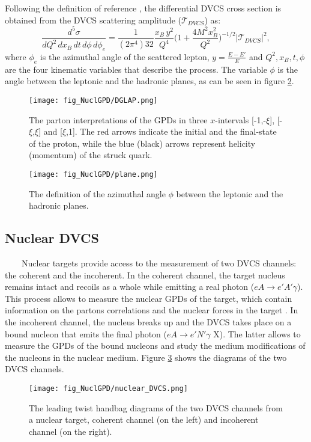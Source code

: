Following the definition of reference \cite{Ji:1998pc}, the differential DVCS 
cross section is obtained from the DVCS scattering amplitude 
($\mathcal{T}_{DVCS}$) as:
\begin{equation}
 \frac{d^{5}\sigma}{dQ^{2}\, dx_{B}\, dt\, d\phi\, d\phi_{e}} = 
 \frac{1}{(2\pi^{4})32}\frac{x_{B}\, 
 y^{2}}{Q^{4}}\bigg(1+\frac{4M^{2}x_{B}^{2}}{Q^{2}}\bigg)^{-1/2} 
 |\mathcal{T}_{DVCS}|^{2},
\label{DVCSCrossSection_tot}
\end{equation}
where $\phi_{e}$ is the azimuthal angle of the scattered lepton, 
$y=\frac{E-E'}{E}$ and $Q^{2},x_{B}, t, \phi$ are the four kinematic variables 
that describe the process. The variable $\phi$ is the angle between the 
leptonic and the hadronic planes, as can be seen in figure \ref{fig:phi}.\\

\begin{figure}[tb]
\centering
\texttt{[image: fig\_NuclGPD/DGLAP.png]}
\caption{The parton interpretations of the GPDs in three $x$-intervals 
[-1,-$\xi$], [-$\xi$,$\xi$] and [$\xi$,1]. The red arrows indicate the initial 
and the final-state of the proton, while the blue (black) arrows represent 
helicity (momentum) of the struck quark.} \label{DGLAP}
\end{figure}

\begin{figure}[tb]
\centering
\texttt{[image: fig\_NuclGPD/plane.png]}
\caption{The definition of the azimuthal angle $\phi$ between the leptonic and 
the hadronic planes.} \label{fig:phi}
\end{figure}



\subsection{Nuclear DVCS}
~~~~Nuclear targets provide access to the measurement of two DVCS channels: the 
coherent and the incoherent. In the coherent channel, the target nucleus 
remains intact and recoils as a whole while emitting a real photon ($eA 
\rightarrow e' A' \gamma$). This process allows to measure the nuclear GPDs of 
the target, which contain information on the partons correlations and the 
nuclear forces in the target \cite{Polyakov:2002yz, Liuti:2005qj}. In the 
incoherent channel, the nucleus breaks up and the DVCS takes place on a bound 
nucleon that emits the final photon ($eA \rightarrow e' N' \gamma$ X). The 
latter allows to measure the GPDs of the bound nucleons and study the medium 
modifications of the nucleons in the nuclear medium. Figure 
\ref{fig:nuclear_DVCS} shows the diagrams of the two DVCS channels.
\begin{figure}[tbp]
\centering
\texttt{[image: fig\_NuclGPD/nuclear\_DVCS.png]}
\caption{ The leading twist handbag diagrams of the two DVCS channels from a 
nuclear target, coherent channel (on the left) and incoherent channel (on the 
right). } \label{fig:nuclear_DVCS}
\end{figure}

